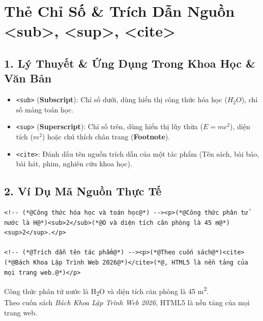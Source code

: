 \documentclass[11pt,oneside]{book}
\newcommand{\codeinline}[1]{\textcolor{accentOrange}{\texttt{#1}}}
\newcommand{\term}[1]{\textbf{\textcolor{primaryBlue}{#1}}}
\begin{document}
\section{Thẻ Chỉ Số \& Trích Dẫn Nguồn <sub>, <sup>, <cite>}
\subsection{1. Lý Thuyết \& Ứng Dụng Trong Khoa Học \& Văn Bản}
\begin{itemize}
    \item \codeinline{<sub>} (\term{Subscript}): Chỉ số dưới, dùng hiển thị công thức hóa học ($H_2O$), chỉ số mảng toán học.
    \item \codeinline{<sup>} (\term{Superscript}): Chỉ số trên, dùng hiển thị lũy thừa ($E=mc^2$), diện tích ($m^2$) hoặc chú thích chân trang (\term{Footnote}).
    \item \codeinline{<cite>}: Đánh dấu tên nguồn trích dẫn của một tác phẩm (Tên sách, bài báo, bài hát, phim, nghiên cứu khoa học).
\end{itemize}

\subsection{2. Ví Dụ Mã Nguồn Thực Tế}
\begin{codeWindow}
\begin{lstlisting}[language=HTML5]
<!-- (*@Công thức hóa học và toán học@*) --><p>(*@Công thức phân tử nước là H@*)<sub>2</sub>(*@O và diện tích căn phòng là 45 m@*)<sup>2</sup>.</p>

<!-- (*@Trích dẫn tên tác phẩm@*) --><p>(*@Theo cuốn sách@*)<cite>(*@Bách Khoa Lập Trình Web 2026@*)</cite>(*@, HTML5 là nền tảng của mọi trang web.@*)</p>
\end{lstlisting}
\end{codeWindow}

\begin{browserWindow}
\sffamily\small
Công thức phân tử nước là H\textsubscript{2}O và diện tích căn phòng là 45 m\textsuperscript{2}.\\[4pt]
Theo cuốn sách \textit{Bách Khoa Lập Trình Web 2026}, HTML5 là nền tảng của mọi trang web.
\end{browserWindow}

\end{document}
